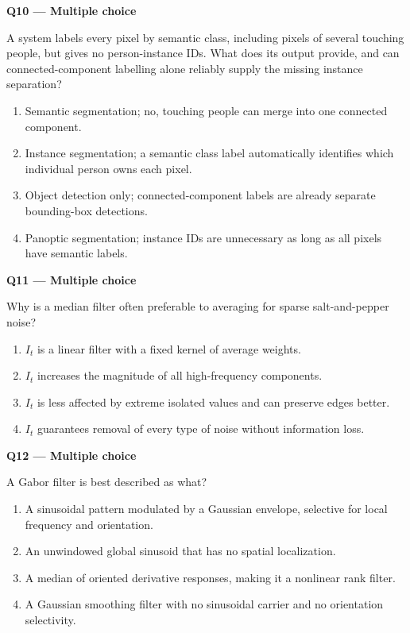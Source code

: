 \documentclass[11pt,a4paper]{article}
\begin{document}
\par\vspace{12pt}
\begin{minipage}{\linewidth}
\textbf{Q10 — Multiple choice}\par\smallskip
A system labels every pixel by semantic class,\allowbreak{} including pixels of several touching people,\allowbreak{} but gives no person-instance IDs. What does its output provide,\allowbreak{} and can connected-component labelling alone reliably supply the missing instance separation?
\begin{enumerate}[label=\textbf{\Alph*.}]
\item Semantic segmentation; no,\allowbreak{} touching people can merge into one connected component.
\item Instance segmentation; a semantic class label automatically identifies which individual person owns each pixel.
\item Object detection only; connected-component labels are already separate bounding-box detections.
\item Panoptic segmentation; instance IDs are unnecessary as long as all pixels have semantic labels.
\end{enumerate}
\end{minipage}
\par\vspace{12pt}
\begin{minipage}{\linewidth}
\textbf{Q11 — Multiple choice}\par\smallskip
Why is a median filter often preferable to averaging for sparse salt-and-pepper noise?
\begin{enumerate}[label=\textbf{\Alph*.}]
\item \(I_t\) is a linear filter with a fixed kernel of average weights.
\item \(I_t\) increases the magnitude of all high-frequency components.
\item \(I_t\) is less affected by extreme isolated values and can preserve edges better.
\item \(I_t\) guarantees removal of every type of noise without information loss.
\end{enumerate}
\end{minipage}
\par\vspace{12pt}
\begin{minipage}{\linewidth}
\textbf{Q12 — Multiple choice}\par\smallskip
A Gabor filter is best described as what?
\begin{enumerate}[label=\textbf{\Alph*.}]
\item A sinusoidal pattern modulated by a Gaussian envelope,\allowbreak{} selective for local frequency and orientation.
\item An unwindowed global sinusoid that has no spatial localization.
\item A median of oriented derivative responses,\allowbreak{} making it a nonlinear rank filter.
\item A Gaussian smoothing filter with no sinusoidal carrier and no orientation selectivity.
\end{enumerate}
\end{minipage}
\end{document}
